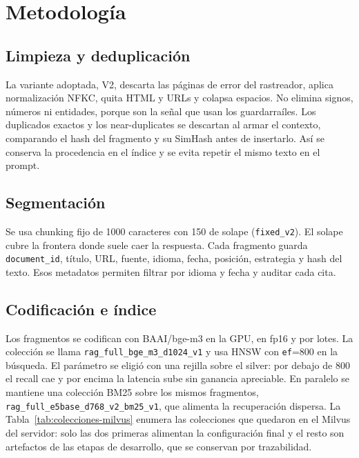 \section{Metodolog\'ia}
\label{sec:metodo}

\subsection{Limpieza y deduplicaci\'on}
\label{sec:limpieza}

La variante adoptada, V2, descarta las p\'aginas de error del rastreador, aplica normalizaci\'on NFKC, quita HTML y URLs y colapsa espacios. No elimina signos, n\'umeros ni entidades, porque son la se\~nal que usan los guardarra\'iles. Los duplicados exactos y los near-duplicates se descartan al armar el contexto, comparando el hash del fragmento y su SimHash antes de insertarlo. As\'i se conserva la procedencia en el \'indice y se evita repetir el mismo texto en el prompt.

\subsection{Segmentaci\'on}
\label{sec:chunking}

Se usa chunking fijo de 1000 caracteres con 150 de solape (\texttt{fixed\_v2}). El solape cubre la frontera donde suele caer la respuesta. Cada fragmento guarda \texttt{document\_id}, t\'itulo, URL, fuente, idioma, fecha, posici\'on, estrategia y hash del texto. Esos metadatos permiten filtrar por idioma y fecha y auditar cada cita.

\subsection{Codificaci\'on e \'indice}
\label{sec:indice}

Los fragmentos se codifican con BAAI/bge-m3 en la GPU, en fp16 y por lotes. La colecci\'on se llama \texttt{rag\_full\_bge\_m3\_d1024\_v1} y usa HNSW con \texttt{ef}=800 en la b\'usqueda. El par\'ametro se eligi\'o con una rejilla sobre el silver: por debajo de 800 el recall cae y por encima la latencia sube sin ganancia apreciable. En paralelo se mantiene una colecci\'on BM25 sobre los mismos fragmentos, \texttt{rag\_full\_e5base\_d768\_v2\_bm25\_v1}, que alimenta la recuperaci\'on dispersa. La Tabla~\ref{tab:colecciones-milvus} enumera las colecciones que quedaron en el Milvus del servidor: solo las dos primeras alimentan la configuraci\'on final y el resto son artefactos de las etapas de desarrollo, que se conservan por trazabilidad.

